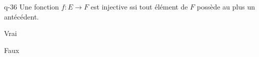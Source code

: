 \begin{truefalse}{q-36}
Une fonction $f : E\to F$ est injective ssi tout élément de $F$ possède au plus un antécédent.
\item* Vrai
\item Faux
\end{truefalse}

